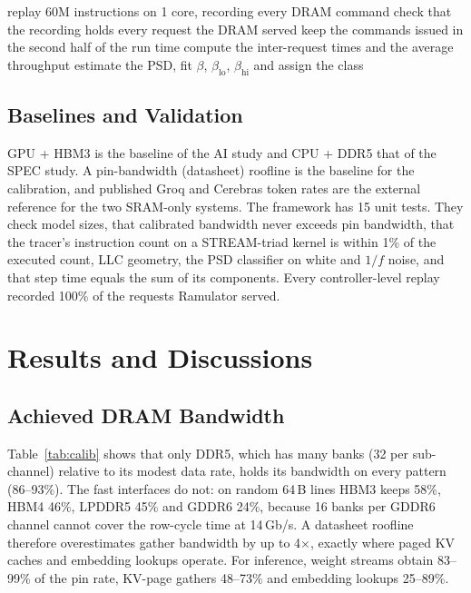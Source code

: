 \documentclass[12pt]{article}
\newcommand{\tmx}{\ensuremath{\times}}
\begin{document}
\begin{algorithm}[H]
\caption{Controller-level characterization}
\label{alg:psd}
\begin{algorithmic}[1]
  \STATE replay 60M instructions on 1 core, recording every DRAM command
  \STATE check that the recording holds every request the DRAM served
  \STATE keep the commands issued in the second half of the run time
  \STATE compute the inter-request times and the average throughput
  \STATE estimate the PSD, fit $\beta$, $\beta_{\mathrm{lo}}$, $\beta_{\mathrm{hi}}$ and assign the class
\ENDFOR
\end{algorithmic}
\end{algorithm}

\subsection{Baselines and Validation}
GPU + HBM3 is the baseline of the AI study and CPU + DDR5 that of the SPEC study. A pin-bandwidth (datasheet) roofline is the baseline for the calibration, and published Groq and Cerebras token rates are the external reference for the two SRAM-only systems. The framework has 15 unit tests. They check model sizes, that calibrated bandwidth never exceeds pin bandwidth, that the tracer's instruction count on a STREAM-triad kernel is within 1\% of the executed count, LLC geometry, the PSD classifier on white and $1/f$ noise, and that step time equals the sum of its components. Every controller-level replay recorded 100\% of the requests Ramulator served.
\newpage

\section{Results and Discussions}\label{sec:results}
\subsection{Achieved DRAM Bandwidth}
Table~\ref{tab:calib} shows that only DDR5, which has many banks (32 per sub-channel) relative to its modest data rate, holds its bandwidth on every pattern (86--93\%). The fast interfaces do not: on random 64\,B lines HBM3 keeps 58\%, HBM4 46\%, LPDDR5 45\% and GDDR6 24\%, because 16 banks per GDDR6 channel cannot cover the row-cycle time at 14\,Gb/s. A datasheet roofline therefore overestimates gather bandwidth by up to 4\tmx, exactly where paged KV caches and embedding lookups operate. For inference, weight streams obtain 83--99\% of the pin rate, KV-page gathers 48--73\% and embedding lookups 25--89\%.
\end{document}

